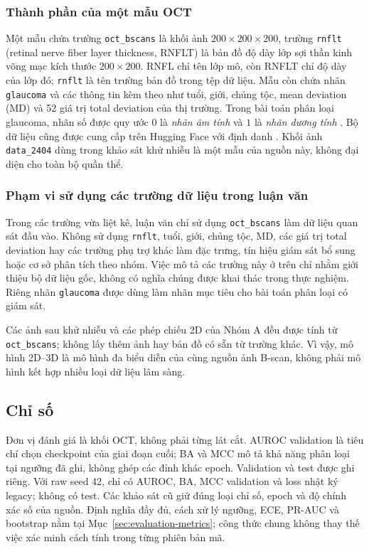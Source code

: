 \documentclass[14pt,a4paper,oneside]{extreport}
\begin{document}
\subsubsection{Thành phần của một mẫu OCT}
Một mẫu chứa trường \texttt{oct\_bscans} là khối ảnh $200\times200\times200$,
trường \texttt{rnflt} (retinal nerve fiber layer thickness, RNFLT)
là bản đồ độ dày lớp sợi thần kinh võng mạc kích thước $200\times200$.
RNFL chỉ tên lớp mô, còn RNFLT chỉ độ dày của lớp đó; \texttt{rnflt}
là tên trường bản đồ trong tệp dữ liệu. Mẫu còn chứa nhãn
\texttt{glaucoma} và các thông tin kèm theo như tuổi, giới, chủng tộc,
mean deviation (MD) và 52 giá trị total deviation của thị trường.
Trong bài toán phân loại glaucoma, nhãn số được quy
ước $0$ là \textit{nhãn âm tính} và $1$ là \textit{nhãn dương tính}
\cite{harvardgfRepo}. Bộ dữ liệu cũng được cung cấp trên Hugging Face
với định danh 
\cite{harvardgfHF}. Khối ảnh \texttt{data\_2404} dùng trong khảo sát
khử nhiễu là một mẫu của nguồn này, không đại diện cho toàn bộ quần thể.

\subsubsection{Phạm vi sử dụng các trường dữ liệu trong luận văn}
Trong các trường vừa liệt kê, luận văn chỉ sử dụng
\texttt{oct\_bscans} làm dữ liệu quan sát đầu vào. Không sử dụng
\texttt{rnflt}, tuổi, giới, chủng tộc, MD, các giá trị total deviation
hay các trường phụ trợ khác làm đặc trưng, tín hiệu giám sát bổ sung
hoặc cơ sở phân tích theo nhóm. Việc mô tả các trường này ở trên chỉ
nhằm giới thiệu bộ dữ liệu gốc, không có nghĩa chúng được khai thác
trong thực nghiệm. Riêng nhãn \texttt{glaucoma}
được dùng làm nhãn mục tiêu cho bài toán phân loại có giám sát.

Các ảnh sau khử nhiễu và các phép chiếu 2D của Nhóm A đều được tính
từ \texttt{oct\_bscans}; không lấy thêm ảnh hay bản đồ có sẵn từ
trường khác. Vì vậy, mô hình 2D--3D là mô hình đa biểu diễn của cùng
nguồn ảnh B-scan, không phải mô hình kết hợp nhiều loại dữ liệu lâm sàng.

\subsection{Chỉ số}
Đơn vị đánh giá là khối OCT, không phải từng lát cắt. AUROC validation
là tiêu chí chọn checkpoint của giai đoạn cuối; BA và MCC mô tả
khả năng phân loại tại ngưỡng đã ghi, không ghép các đỉnh khác epoch.
Validation và test được ghi riêng. Với raw seed 42, chỉ có AUROC,
BA, MCC validation và loss nhật ký legacy; không có test. Các khảo
sát cũ giữ đúng loại chỉ số, epoch và độ chính xác số của nguồn.
Định nghĩa đầy đủ, cách xử lý ngưỡng, ECE, PR-AUC và bootstrap nằm
tại Mục~\ref{sec:evaluation-metrics}; công thức chung không thay thế
việc xác minh cách tính trong từng phiên bản mã.
\end{document}
